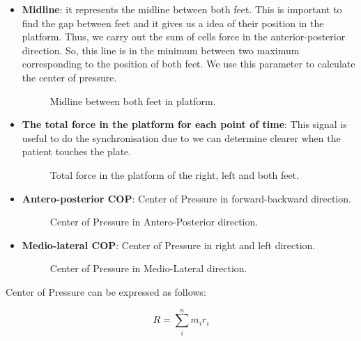 \begin{itemize}
	\item \textbf{Midline}: it represents the midline between both feet. This is important to find the gap between feet and it gives us a idea of their position in the platform. Thus, we carry out the sum of cells force in the anterior-posterior direction. So, this line is in the minimum between two maximum corresponding to the position of both feet. We use this parameter to calculate the center of pressure.
	\begin{figure}[H]
		\centering
		\caption{Midline between both feet in platform.}
		\label{fig:midlineForceplate}
	\end{figure}
	
	\item \textbf{The total force in the platform for each point of time}: This signal is useful to do the synchronisation due to we can determine clearer when the patient touches the plate.
		\begin{figure}[H]
			\centering
			\caption{Total force in the platform of the right, left and both feet.}
			\label{fig:forceFP}
		\end{figure}
	
	\item \textbf{Antero-posterior COP}: Center of Pressure in forward-backward direction.
		\begin{figure}[H]
			\centering
			\caption{Center of Pressure in Antero-Posterior direction.}
			\label{fig:APCOP}
		\end{figure}	
	
	\item \textbf{Medio-lateral  COP}: Center of Pressure  in right and left direction.
			\begin{figure}[H]
				\centering
				\caption{Center of Pressure in Medio-Lateral direction.}
				\label{fig:MLCOP}
			\end{figure}
	
\end{itemize}

Center of Pressure can be expressed as follows:

\begin{equation}
	\label{COP}
	R=\sum_{i}^{n}m_{i}r_{i}
\end{equation}


